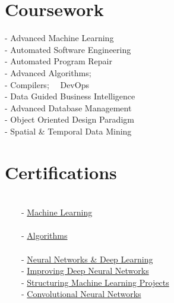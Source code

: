 \documentclass[]{bigfatnoob-resume}
\begin{document}
\begin{minipage}[t]{0.33\textwidth} 


\section{Coursework}
- Advanced Machine Learning \\
- Automated Software Engineering \\
- Automated Program Repair\\
- Advanced Algorithms;\\
- Compilers; \ \  DevOps \\
- Data Guided Business Intelligence\\
- Advanced Database Management \\
- Object Oriented Design Paradigm\\
- Spatial \& Temporal Data Mining\\
\sectionsep


\section{Certifications}
 \\
\ \ \ \ - \href{https://github.com/bigfatnoob/bigfatnoob.github.io/blob/master/other-files/certifications/ML.pdf}{Machine Learning} \\
 \\
\ \ \ \ - \href{https://github.com/bigfatnoob/bigfatnoob.github.io/blob/master/other-files/certifications/Algorithms1.pdf}{Algorithms}\\
 \\
\ \ \ \ - \href{https://github.com/bigfatnoob/bigfatnoob.github.io/blob/master/other-files/certifications/DL1.pdf}{Neural Networks \& Deep Learning}\\
\ \ \ \ - \href{https://github.com/bigfatnoob/bigfatnoob.github.io/blob/master/other-files/certifications/DL2.pdf}{Improving Deep Neural Networks}\\
\ \ \ \ - \href{https://github.com/bigfatnoob/bigfatnoob.github.io/blob/master/other-files/certifications/DL3.pdf}{Structuring Machine Learning Projects}\\
\ \ \ \ - \href{https://github.com/bigfatnoob/bigfatnoob.github.io/blob/master/other-files/certifications/DL4.pdf}{Convolutional Neural Networks}\\
\sectionsep


\end{minipage}
\end{document}
